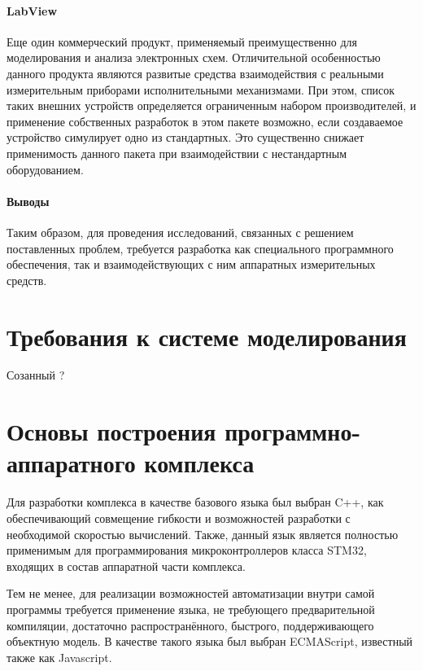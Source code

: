 \paragraph{LabView}

Еще один коммерческий продукт, применяемый преимущественно для
моделирования и анализа электронных схем. Отличительной особенностью
данного продукта являются развитые средства взаимодействия
с реальными измерительным приборами исполнительными механизмами.
При этом, список таких внешних устройств определяется
ограниченным набором производителей, и применение собственных
разработок в этом пакете возможно, если создаваемое устройство
симулирует одно из стандартных. Это существенно снижает применимость
данного пакета при взаимодействии с нестандартным оборудованием.



\paragraph{Выводы}

Таким образом, для проведения исследований, связанных с решением
поставленных проблем, требуется разработка как специального программного
обеспечения, так и взаимодействующих с ним аппаратных измерительных средств.



\section{Требования к системе моделирования} %

Созанный ?

\section{Основы построения программно-аппаратного комплекса} %

Для разработки комплекса в качестве базового языка был выбран C++,
как обеспечивающий совмещение гибкости и возможностей разработки
с необходимой скоростью вычислений. Также, данный язык
является полностью применимым для программирования микроконтроллеров
класса STM32, входящих в состав аппаратной части комплекса.

Тем не менее, для реализации возможностей автоматизации
внутри самой программы требуется применение языка,
не требующего предварительной компиляции, достаточно распространённого,
быстрого, поддерживающего объектную модель.
В качестве такого языка был выбран ECMAScript, известный также
как Javascript.

